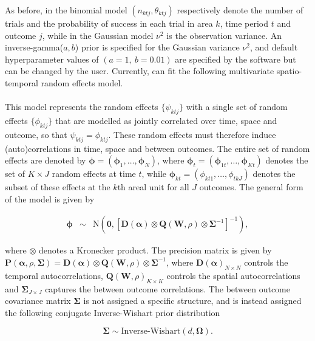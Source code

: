 \documentclass[article, nojss]{jss}
\begin{document}
As before, in the binomial model $(n_{ktj}, \theta_{ktj})$ respectively denote the number of trials and the probability of success in each trial in area $k$, time period $t$ and outcome $j$, while in the Gaussian model $\nu^2$ is the observation variance. An inverse-gamma($a,b$) prior is specified for the Gaussian variance $\nu^2$, and default hyperparameter values of $(a=1,~ b=0.01)$  are specified by the software but can be changed by the user. Currently,  can fit the following multivariate spatio-temporal random effects model.\\ 


\\
This model represents the random effects $\{\psi_{ktj}\}$ with a single set of random effects $\{\phi_{ktj}\}$ that are modelled as jointly correlated over time, space and outcome, so that $\psi_{ktj}=\phi_{ktj}$. These random effects must therefore induce (auto)correlations in time, space and between outcomes. The entire set of random effects are denoted by $\boldsymbol{\phi}=(\boldsymbol{\phi}_1,\ldots, \boldsymbol{\phi}_N)$, where $\boldsymbol{\phi}_t=(\boldsymbol{\phi}_{1t}, \ldots, \boldsymbol{\phi}_{Kt})$ denotes the set of $K\times J$ random effects at time $t$, while $\boldsymbol{\phi}_{kt}=(\phi_{kt1},\ldots, \phi_{tkJ})$ denotes the subset of these effects at the $k$th areal unit for all $J$ outcomes. The general form of the model is given by

\begin{eqnarray}
\boldsymbol{\phi} &\sim& \mbox{N}\left(\mathbf{0}, \left[\mathbf{D}(\boldsymbol{\alpha}) \otimes \mathbf{Q}(\mathbf{W}, \rho)\otimes \boldsymbol{\Sigma}^{-1}\right]^{-1} \right),\label{eq_joint}
\end{eqnarray}

where $\otimes$ denotes a Kronecker product. The precision matrix is given by  $\mathbf{P}(\boldsymbol{\alpha},\rho, \boldsymbol{\Sigma})=\mathbf{D}(\boldsymbol{\alpha}) \otimes \mathbf{Q}(\mathbf{W}, \rho)\otimes \boldsymbol{\Sigma}^{-1}$, where $\mathbf{D}(\boldsymbol{\alpha})_{N\times N}$ controls the temporal autocorrelations, $\mathbf{Q}(\mathbf{W}, \rho)_{K\times K}$ controls the spatial autocorrelations and $\boldsymbol{\Sigma}_{J\times J}$ captures the between outcome correlations. The between outcome covariance matrix  $\boldsymbol{\Sigma}$ is not assigned a specific structure, and is instead assigned the following conjugate Inverse-Wishart prior distribution

\begin{equation}
    \boldsymbol{\Sigma}\sim\mbox{Inverse-Wishart}(d, \boldsymbol{\Omega}).
\end{equation}
\end{document}
